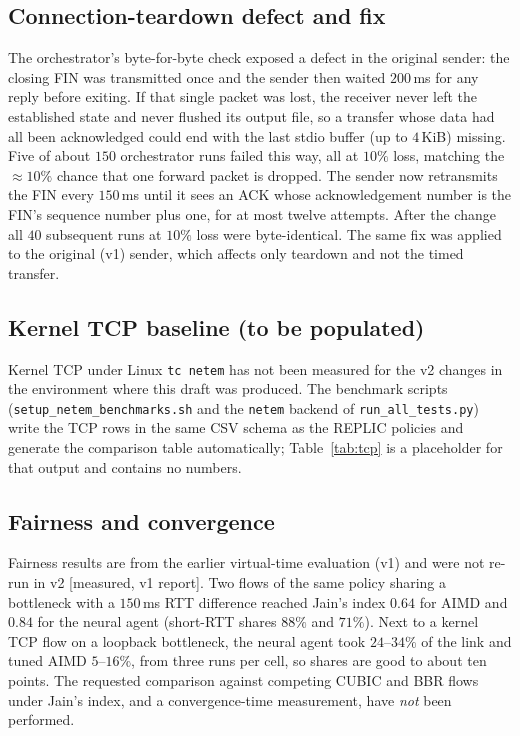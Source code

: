 \subsection{Connection-teardown defect and fix}
\label{sec:fin}
The orchestrator's byte-for-byte check exposed a defect in the original sender: the closing FIN was transmitted once and the sender then waited $200$\,ms for any reply before exiting. If that single packet was lost, the receiver never left the established state and never flushed its output file, so a transfer whose data had all been acknowledged could end with the last stdio buffer (up to $4$\,KiB) missing. Five of about $150$ orchestrator runs failed this way, all at $10\%$ loss, matching the $\approx\!10\%$ chance that one forward packet is dropped. The sender now retransmits the FIN every $150$\,ms until it sees an ACK whose acknowledgement number is the FIN's sequence number plus one, for at most twelve attempts. After the change all $40$ subsequent runs at $10\%$ loss were byte-identical. The same fix was applied to the original (v1) sender, which affects only teardown and not the timed transfer.

\subsection{Kernel TCP baseline (to be populated)}
\label{sec:tcp}
Kernel TCP under Linux \texttt{tc netem} has not been measured for the v2 changes in the environment where this draft was produced. The benchmark scripts (\texttt{setup\_netem\_benchmarks.sh} and the \texttt{netem} backend of \texttt{run\_all\_tests.py}) write the TCP rows in the same CSV schema as the REPLIC policies and generate the comparison table automatically; Table~\ref{tab:tcp} is a placeholder for that output and contains no numbers.
\begin{table}[t]\centering\small
\caption{Completion time (ms) for kernel TCP and REPLIC policies under netem; generated file, mean/median/p95/p99. Not yet populated.}
\label{tab:tcp}
\end{table}

\subsection{Fairness and convergence}
Fairness results are from the earlier virtual-time evaluation (v1) and were not re-run in v2 [measured, v1 report]. Two flows of the same policy sharing a bottleneck with a $150$\,ms RTT difference reached Jain's index $0.64$ for AIMD and $0.84$ for the neural agent (short-RTT shares $88\%$ and $71\%$). Next to a kernel TCP flow on a loopback bottleneck, the neural agent took $24$--$34\%$ of the link and tuned AIMD $5$--$16\%$, from three runs per cell, so shares are good to about ten points. The requested comparison against competing CUBIC and BBR flows under Jain's index, and a convergence-time measurement, have \emph{not} been performed.

